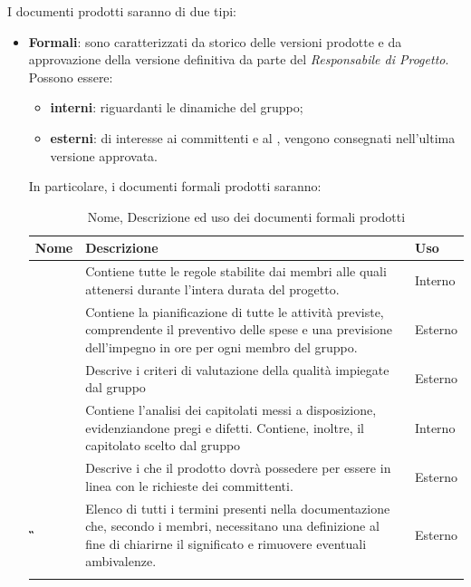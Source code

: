 {I documenti prodotti saranno di due tipi:
\begin{itemize}
	\item \textbf{Formali}: sono caratterizzati da storico delle versioni prodotte e da approvazione della versione definitiva da parte del \textit{Responsabile di Progetto}. Possono essere:
	\begin{itemize}
		\item \textbf{interni}: riguardanti le dinamiche del gruppo;
		\item \textbf{esterni}: di interesse ai committenti e al , vengono consegnati nell'ultima versione approvata.
	\end{itemize} 
In particolare, i documenti formali prodotti saranno:
{
	\setlength{\freewidth}{\dimexpr\textwidth-1\tabcolsep}
	\renewcommand{\arraystretch}{1.5}
	\setlength{\aboverulesep}{0pt}
	\setlength{\belowrulesep}{0pt}
	\begin{longtable}{L{.210\freewidth} L{.6\freewidth} L{.080\freewidth}}
		\textbf{Nome} & \textbf{Descrizione} & \textbf{Uso}\\
		\toprule
		\endhead		
		\textbf{\NdP{}} & Contiene tutte le regole stabilite dai membri alle quali attenersi durante l'intera durata del progetto. & Interno \\ 
		\textbf{\PdP{}} & Contiene la pianificazione di tutte le attività previste, comprendente il preventivo delle spese e una previsione dell'impegno in ore per ogni membro del gruppo. & Esterno \\
		\textbf{\PdQ{}} & Descrive i criteri di valutazione della qualità impiegate dal gruppo & Esterno \\ 
		\textbf{\SdF{}} & Contiene l'analisi dei capitolati messi a disposizione, evidenziandone pregi e difetti. Contiene, inoltre, il capitolato scelto dal gruppo & Interno \\
		\textbf{\AdR{}} & Descrive i  che il prodotto dovrà possedere per essere in linea con le richieste dei committenti. & Esterno \\ 	
		\textbf{\G{}} & Elenco di tutti i termini presenti nella documentazione che, secondo i membri, necessitano una definizione al fine di chiarirne il significato e rimuovere eventuali ambivalenze. & Esterno \\  			
		\bottomrule
		\hiderowcolors
		\caption{Nome, Descrizione ed uso dei documenti formali prodotti}
	\end{longtable}
}


\end{itemize}}
